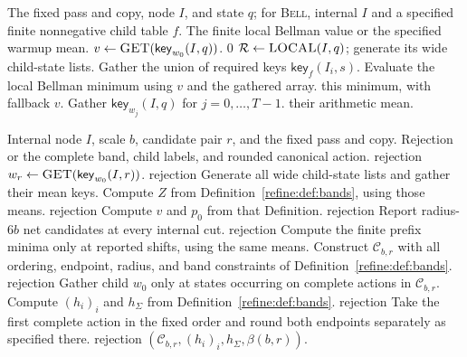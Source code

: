 \documentclass[11pt]{article}
\newcommand{\wedkey}[2]{\mathsf{key}_{#1}(#2)}
\newenvironment{wedalgorithm}[2]{%
  \begin{algorithm}[!htbp]%
  \caption{#1}\label{#2}%
  \small\begin{algorithmic}[1]%
}{%
  \end{algorithmic}\end{algorithm}%
}
\theoremstyle{definition}
\newcommand{\cA}{\mathcal A}
\newcommand{\cC}{\mathcal C}
\newcommand{\1}{\mathbf 1}
\begin{document}
\begin{wedalgorithm}{Bellman propagation and the warmup mean}{alg:bell-mean}
\Require The fixed pass and copy, node $I$, and state $q$; for \textsc{Bell}, internal $I$ and a specified finite nonnegative child table $f$.
\Ensure The finite local Bellman value or the specified warmup mean.
  \State $v\gets\Call{GET}{\wedkey{w_0}{I,q}}$.
   \State \Return $0$ \EndIf
  \State $\mathcal R\gets\Call{LOCAL}{I,q}$; generate its wide child-state lists.
  \State Gather the union of required keys $\wedkey{f}{I_i,s}$.
  \State Evaluate the local Bellman minimum using $v$ and the gathered array.
  \State \Return this minimum, with fallback $v$.
\EndProcedure
\Statex
{}
  \State Gather $\wedkey{w_j}{I,q}$ for $j=0,\ldots,T-1$.
  \State \Return their arithmetic mean.
\EndProcedure
\end{wedalgorithm}

\begin{wedalgorithm}{A complete retained band}{alg:band}
\Require Internal node $I$, scale $b$, candidate pair $r$, and the fixed pass and copy.
\Ensure Rejection or the complete band, child labels, and rounded canonical action.
   \State \Return rejection \EndIf
  \State $w_r\gets\Call{GET}{\wedkey{w_0}{I,r}}$.
   \State \Return rejection \EndIf
  \State Generate all wide child-state lists and gather their mean keys.
  \State Compute $Z$ from Definition~\ref{refine:def:bands}, using those means.
   \State \Return rejection \EndIf
  \State Compute $\widehat v$ and $p_0$ from that Definition.
   \State \Return rejection \EndIf
  \State Report radius-$6b$ net candidates at every internal cut.
   \State \Return rejection \EndIf
  \State Compute the finite prefix minima only at reported shifts, using the same means.
  \State Construct $\cC_{b,r}$ with all ordering, endpoint, radius, and band constraints of Definition~\ref{refine:def:bands}.
  \If{$\cC_{b,r}=\varnothing$} \State \Return rejection \EndIf
  \State Gather child $w_0$ only at states occurring on complete actions in $\cC_{b,r}$.
  \State Compute $(h_i)_i$ and $h_\Sigma$ from Definition~\ref{refine:def:bands}.
   \State \Return rejection \EndIf
  \State Take the first complete action in the fixed order and round both endpoints separately as specified there.
  \If{$\beta(b,r)\notin\cA_{b,r}$ or some $|z(I_i,s_i(\beta(b,r)))|>2h_i$}
    \State \Return rejection
  \EndIf
  \State \Return $(\cC_{b,r},(h_i)_i,h_\Sigma,\beta(b,r))$.
\EndProcedure
\end{wedalgorithm}
\end{document}
